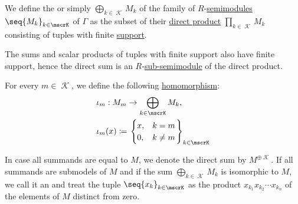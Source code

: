 \begin{definition}\label{def:semimodule_direct_sum}\mimprovised
  We define the  or simply  \( \bigoplus_{k \in \mscrK} M_k \) of the family of \( R \)-\hyperref[def:semimodule]{semimodules} \( \seq{ M_k }_{k \in \mscrK} \) of \( \Gamma \) as the subset of their \hyperref[def:first_order_direct_product]{direct product} \( \prod_{k \in \mscrK} M_k \) consisting of tuples with finite \hyperref[def:function_support]{support}.

  The sums and scalar products of tuples with finite support also have finite support, hence the direct sum is an \( R \)-\hyperref[def:semimodule/submodel]{sub-semimodule} of the direct product.

  \begin{thmenum}
     For every \( m \in \mscrK \), we define the following  \hyperref[def:semimodule/homomorphism]{homomorphism}:
    \begin{equation*}
      \begin{aligned}
        &\iota_m: M_m \to \bigoplus_{k \in \mscrK} M_k, \\
        &\iota_m(x) \coloneqq \begin{rcases}
          \begin{cases}
            x, &k = m \\
            0, &k \neq m
          \end{cases}
        \end{rcases}_{k \in \mscrK}
      \end{aligned}
    \end{equation*}

     In case all summands are equal to \( M \), we denote the direct sum by \( M^{\oplus \mscrK} \).
     If all summands are submodels of \( M \) and if the sum \( \bigoplus_{k \in \mscrK} M_k \) is isomorphic to \( M \), we call it an  and treat the tuple \( \seq{ x_k }_{k \in \mscrK} \) as the product \( x_{k_1} x_{k_2} \cdots x_{k_n} \) of the elements of \( M \) distinct from zero.
  \end{thmenum}
\end{definition}

